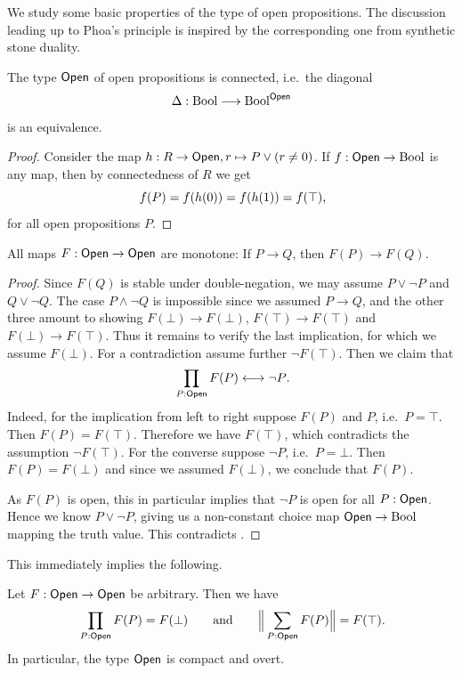 We study some basic properties of the type of open propositions.
The discussion leading up to Phoa's principle is inspired by the corresponding one from synthetic stone duality.

\begin{lemma}
  \label{open-connected}
  The type $\mathsf{Open}$ of open propositions is connected, i.e.\ the diagonal
  \[
    \Delta : \mathrm{Bool} \longrightarrow \mathrm{Bool}^{\mathsf{Open}}
  \]
  is an equivalence.
\end{lemma}

\begin{proof}
  Consider the map $h:R \to \mathsf{Open}, r \mapsto P \lor (r \neq 0)$.
  If $f : \mathsf{Open} \to \mathrm{Bool}$ is any map, then by connectedness of $R$ we get
  \[
    f(P) = f(h(0)) = f(h(1)) = f(\top)\rlap{,}
  \]
  for all open propositions $P$.
\end{proof}

\begin{lemma}
  \label{open-monotony}
  All maps $F : \mathsf{Open} \to \mathsf{Open}$ are monotone: If $P \to Q$, then $F(P) \to F(Q)$.
\end{lemma}

\begin{proof}
  Since $F(Q)$ is stable under double-negation, we may assume $P \lor \neg P$ and $Q \lor \neg Q$.
  The case $P \land \neg Q$ is impossible since we assumed $P \to Q$, and the other three amount to showing $F(\bot) \to F(\bot)$, $F(\top) \to F(\top)$ and $F(\bot) \to F(\top)$.
  Thus it remains to verify the last implication, for which we assume $F(\bot)$.
  For a contradiction assume further $\neg F(\top)$.
  Then we claim that
  \[
    \prod_{P:\Open} F(P) \longleftrightarrow \neg P \rlap{.}
  \]
  Indeed, for the implication from left to right suppose $F(P)$ and $P$, i.e.\ $P=\top$. Then $F(P)=F(\top)$.
  Therefore we have $F(\top)$, which contradicts the assumption $\neg F(\top)$.
  For the converse suppose $\neg P$, i.e.\ $P = \bot$.
  Then $F(P) = F(\bot)$ and since we assumed $F(\bot)$, we conclude that $F(P)$.

  As $F(P)$ is open, this in particular implies that $\neg P$ is open for all $P : \mathsf{Open}$.
  Hence we know $P \lor \neg P$, giving us a non-constant choice map $\mathsf{Open} \to \mathrm{Bool}$ mapping the truth value.
  This contradicts .
\end{proof}

This immediately implies the following.

\begin{corollary}
  Let $F : \mathsf{Open} \to \mathsf{Open}$ be arbitrary.
  Then we have
  \[
    \prod_{P: \Open} F(P) = F(\bot)
    \qquad\text{and}\qquad
    \Big\| \sum_{P : \Open} F(P) \Big\| = F(\top) \rlap{.}
  \]
  In particular, the type $\mathsf{Open}$ is compact and overt.
\end{corollary}


